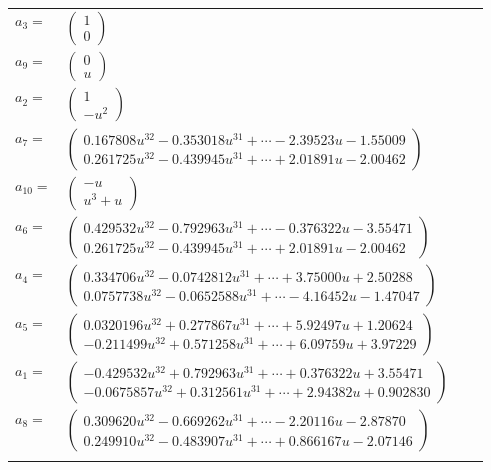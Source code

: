 \documentclass[1p]{elsarticle_modified}
\theoremstyle{definition}
\begin{document}
\begin{tabular}{m{7pt} m{180pt} m{7pt} m{180pt} }
\flushright $a_{3}=$&$\begin{pmatrix}1\\0\end{pmatrix}$ \\
\flushright $a_{9}=$&$\begin{pmatrix}0\\u\end{pmatrix}$ \\
\flushright $a_{2}=$&$\begin{pmatrix}1\\- u^2\end{pmatrix}$ \\
\flushright $a_{7}=$&$\begin{pmatrix}0.167808 u^{32}-0.353018 u^{31}+\cdots-2.39523 u-1.55009\\0.261725 u^{32}-0.439945 u^{31}+\cdots+2.01891 u-2.00462\end{pmatrix}$ \\
\flushright $a_{10}=$&$\begin{pmatrix}- u\\u^3+u\end{pmatrix}$ \\
\flushright $a_{6}=$&$\begin{pmatrix}0.429532 u^{32}-0.792963 u^{31}+\cdots-0.376322 u-3.55471\\0.261725 u^{32}-0.439945 u^{31}+\cdots+2.01891 u-2.00462\end{pmatrix}$ \\
\flushright $a_{4}=$&$\begin{pmatrix}0.334706 u^{32}-0.0742812 u^{31}+\cdots+3.75000 u+2.50288\\0.0757738 u^{32}-0.0652588 u^{31}+\cdots-4.16452 u-1.47047\end{pmatrix}$ \\
\flushright $a_{5}=$&$\begin{pmatrix}0.0320196 u^{32}+0.277867 u^{31}+\cdots+5.92497 u+1.20624\\-0.211499 u^{32}+0.571258 u^{31}+\cdots+6.09759 u+3.97229\end{pmatrix}$ \\
\flushright $a_{1}=$&$\begin{pmatrix}-0.429532 u^{32}+0.792963 u^{31}+\cdots+0.376322 u+3.55471\\-0.0675857 u^{32}+0.312561 u^{31}+\cdots+2.94382 u+0.902830\end{pmatrix}$ \\
\flushright $a_{8}=$&$\begin{pmatrix}0.309620 u^{32}-0.669262 u^{31}+\cdots-2.20116 u-2.87870\\0.249910 u^{32}-0.483907 u^{31}+\cdots+0.866167 u-2.07146\end{pmatrix}$\\&\end{tabular}
\end{document}
